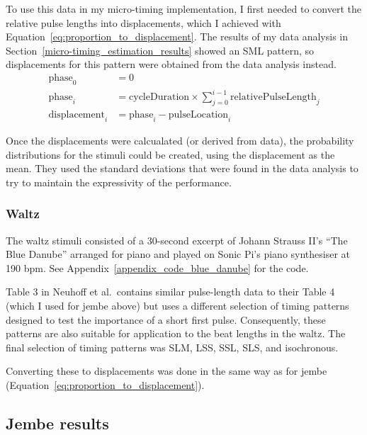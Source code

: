 \documentclass[12pt,twoside,openright]{report}
\begin{document}
To use this data in my micro-timing implementation, I first needed to convert
the relative pulse lengths into displacements, which I achieved with Equation~\ref{eq:proportion_to_displacement}. The
results of my data analysis in Section~\ref{micro-timing_estimation_results} showed an SML pattern, so displacements for this
pattern were obtained from the data analysis instead.
\begin{equation}
    \begin{split}
        \mathrm{phase}_0 &= 0 \\
        \mathrm{phase}_i &= \mathrm{cycleDuration} \times \sum_{j=0}^{i-1} \mathrm{relativePulseLength}_j \\
        \mathrm{displacement}_i &= \mathrm{phase}_i - \mathrm{pulseLocation}_i
    \end{split}
    \label{eq:proportion_to_displacement}
\end{equation}

Once the displacements were calcualated (or derived from data), the probability distributions for the stimuli could be created, using the displacement as the mean. They used the standard deviations that were found in the data analysis to try to maintain the expressivity of the performance.

\subsubsection{Waltz} \label{waltz_stimuli}

The waltz stimuli consisted of a 30-second excerpt of Johann Strauss II's ``The
Blue Danube'' arranged for piano and played on Sonic Pi's piano synthesiser at
190 bpm. See Appendix~\ref{appendix_code_blue_danube} for the code.

Table 3 in Neuhoff et al.\ contains similar
pulse-length data to their Table 4 (which I used for jembe above) but uses a different
selection of timing patterns designed to test the importance of a short first
pulse. Consequently, these patterns are also suitable for application to the
beat lengths in the waltz. The final selection of timing patterns was SLM, LSS,
SSL, SLS, and isochronous.

Converting these to displacements was done in the same way as for jembe (Equation~\ref{eq:proportion_to_displacement}).


\subsection{Jembe results} \label{user_study_jembe_results}
\end{document}
